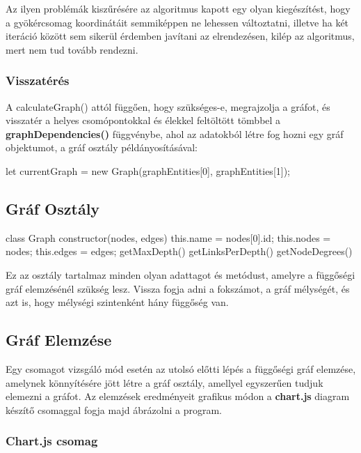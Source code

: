 Az ilyen problémák kiszűrésére az algoritmus kapott egy olyan kiegészítést, hogy a gyökércsomag koordinátáit semmiképpen ne lehessen változtatni, illetve ha két iteráció között sem sikerül érdemben javítani az elrendezésen, kilép az algoritmus, mert nem tud tovább rendezni.\\

\subsubsection{Visszatérés}

A calculateGraph() attól függően, hogy szükséges-e, megrajzolja a gráfot, és visszatér a helyes csomópontokkal és élekkel feltöltött tömbbel a \textbf{graphDependencies()} függvénybe, ahol az adatokból létre fog hozni egy gráf objektumot, a gráf osztály példányosításával:

\begin{js}
let currentGraph = new Graph(graphEntities[0], graphEntities[1]);
\end{js}

\pagebreak

\subsection{Gráf Osztály}

\begin{js}
class Graph{
	constructor(nodes, edges){
		this.name = nodes[0].id;
		this.nodes = nodes;
		this.edges = edges;
	}
	getMaxDepth(){
	}
	getLinksPerDepth(){
	}
	getNodeDegrees(){
	}	
}
\end{js}

Ez az osztály tartalmaz minden olyan adattagot és metódust, amelyre a függőségi gráf elemzésénél szükség lesz. Vissza fogja adni a fokszámot, a gráf mélységét, és azt is, hogy mélységi szintenként hány függőség van.

\subsection{Gráf Elemzése}

Egy csomagot vizsgáló mód esetén az utolsó előtti lépés a függőségi gráf elemzése, amelynek könnyítésére jött létre a gráf osztály, amellyel egyszerűen tudjuk elemezni a gráfot. Az elemzések eredményeit grafikus módon a \textbf{chart.js} diagram készítő csomaggal fogja majd ábrázolni a program.

\subsubsection{Chart.js csomag}

